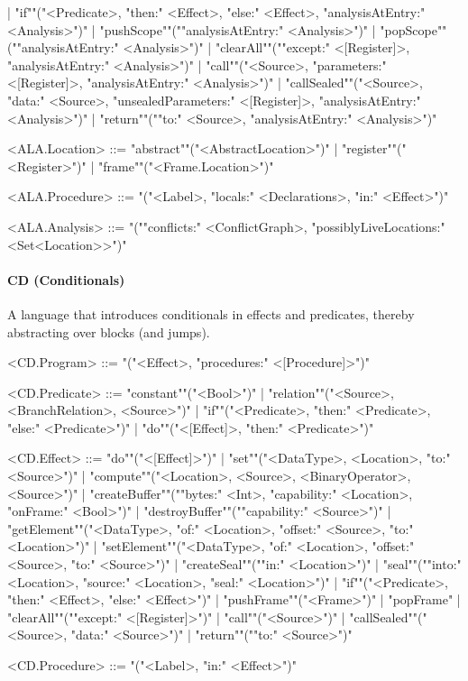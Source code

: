 \documentclass[main.tex]{subfiles}
\begin{document}
\begin{grammar}
						| "if""("<Predicate>, "then:" <Effect>, "else:" <Effect>, "analysisAtEntry:" <Analysis>")"
						| "pushScope""(""analysisAtEntry:" <Analysis>")"
						| "popScope""(""analysisAtEntry:" <Analysis>")"
						| "clearAll""(""except:" <[Register]>, "analysisAtEntry:" <Analysis>")"
						| "call""("<Source>, "parameters:" <[Register]>, "analysisAtEntry:" <Analysis>")"
						| "callSealed""("<Source>, "data:" <Source>, "unsealedParameters:" <[Register]>, "analysisAtEntry:" <Analysis>")"
						| "return""(""to:" <Source>, "analysisAtEntry:" <Analysis>")"
				\par
				<ALA.Location> ::=
						"abstract""("<AbstractLocation>")"
						| "register""("<Register>")"
						| "frame""("<Frame.Location>")"
				\par
				<ALA.Procedure> ::=
							"("<Label>, "locals:" <Declarations>, "in:" <Effect>")"
				\par
				<ALA.Analysis> ::=
							"(""conflicts:" <ConflictGraph>, "possiblyLiveLocations:" <Set<Location>>")"
				\par
\end{grammar}
\par
\paragraph{ CD (Conditionals) } A language that introduces conditionals in effects and predicates, thereby abstracting over blocks (and jumps).
\begin{grammar}
	\footnotesize
				<CD.Program> ::=
							"("<Effect>, "procedures:" <[Procedure]>")"
				\par
				<CD.Predicate> ::=
						"constant""("<Bool>")"
						| "relation""("<Source>, <BranchRelation>, <Source>")"
						| "if""("<Predicate>, "then:" <Predicate>, "else:" <Predicate>")"
						| "do""("<[Effect]>, "then:" <Predicate>")"
				\par
				<CD.Effect> ::=
						"do""("<[Effect]>")"
						| "set""("<DataType>, <Location>, "to:" <Source>")"
						| "compute""("<Location>, <Source>, <BinaryOperator>, <Source>")"
						| "createBuffer""(""bytes:" <Int>, "capability:" <Location>, "onFrame:" <Bool>")"
						| "destroyBuffer""(""capability:" <Source>")"
						| "getElement""("<DataType>, "of:" <Location>, "offset:" <Source>, "to:" <Location>")"
						| "setElement""("<DataType>, "of:" <Location>, "offset:" <Source>, "to:" <Source>")"
						| "createSeal""(""in:" <Location>")"
						| "seal""(""into:" <Location>, "source:" <Location>, "seal:" <Location>")"
						| "if""("<Predicate>, "then:" <Effect>, "else:" <Effect>")"
						| "pushFrame""("<Frame>")"
						| "popFrame"
						| "clearAll""(""except:" <[Register]>")"
						| "call""("<Source>")"
						| "callSealed""("<Source>, "data:" <Source>")"
						| "return""(""to:" <Source>")"
				\par
				<CD.Procedure> ::=
							"("<Label>, "in:" <Effect>")"
				\par
\end{grammar}
\par
\end{document}
